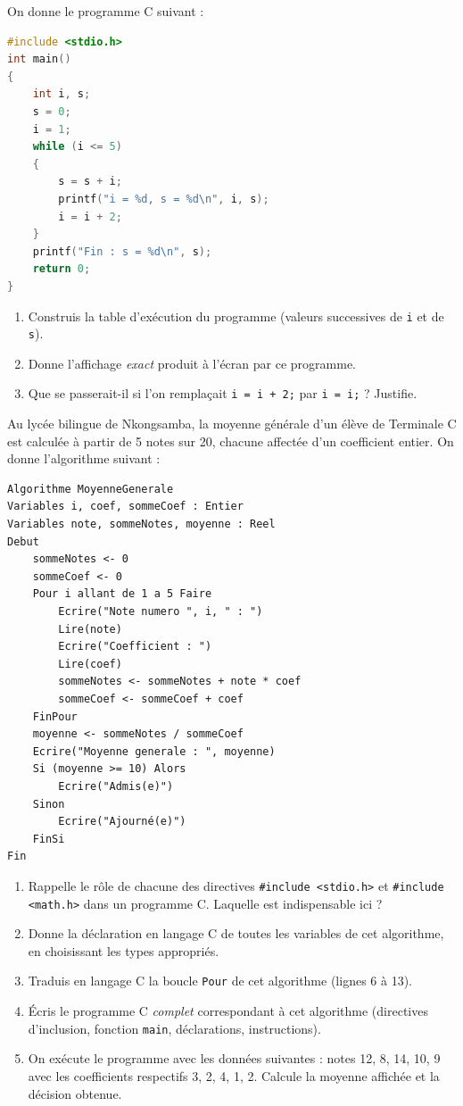 \documentclass[11pt]{article}
\newcounter{popsec}
\newcounter{popsub}
\newcommand{\courssub}[1]{%
  \stepcounter{popsub}%
  \par\vspace{9pt}\noindent{\popxbold\fontsize{11.5}{13}\selectfont\color{popink}{\color{poporange}\thepopsec.\thepopsub}\hspace{6pt}#1}\par\nopagebreak\vspace{4pt}
}
\begin{document}
\begin{exercice}
On donne le programme C suivant :
\begin{lstlisting}[language=C]
#include <stdio.h>
int main()
{
    int i, s;
    s = 0;
    i = 1;
    while (i <= 5)
    {
        s = s + i;
        printf("i = %d, s = %d\n", i, s);
        i = i + 2;
    }
    printf("Fin : s = %d\n", s);
    return 0;
}
\end{lstlisting}
\begin{enumerate}
  \item Construis la table d'exécution du programme (valeurs successives de \texttt{i} et de \texttt{s}).
  \item Donne l'affichage \emph{exact} produit à l'écran par ce programme.
  \item Que se passerait-il si l'on remplaçait \texttt{i = i + 2;} par \texttt{i = i;} ? Justifie.
\end{enumerate}
\end{exercice}

\courssub{Je me prépare au Bac}

\begin{exercice}
Au lycée bilingue de Nkongsamba, la moyenne générale d'un élève de Terminale C est calculée à partir de 5 notes sur 20, chacune affectée d'un coefficient entier. On donne l'algorithme suivant :

\begin{lstlisting}
Algorithme MoyenneGenerale
Variables i, coef, sommeCoef : Entier
Variables note, sommeNotes, moyenne : Reel
Debut
    sommeNotes <- 0
    sommeCoef <- 0
    Pour i allant de 1 a 5 Faire
        Ecrire("Note numero ", i, " : ")
        Lire(note)
        Ecrire("Coefficient : ")
        Lire(coef)
        sommeNotes <- sommeNotes + note * coef
        sommeCoef <- sommeCoef + coef
    FinPour
    moyenne <- sommeNotes / sommeCoef
    Ecrire("Moyenne generale : ", moyenne)
    Si (moyenne >= 10) Alors
        Ecrire("Admis(e)")
    Sinon
        Ecrire("Ajourné(e)")
    FinSi
Fin
\end{lstlisting}

\begin{enumerate}
  \item Rappelle le rôle de chacune des directives \texttt{\#include <stdio.h>} et \texttt{\#include <math.h>} dans un programme C. Laquelle est indispensable ici ?
  \item Donne la déclaration en langage C de toutes les variables de cet algorithme, en choisissant les types appropriés.
  \item Traduis en langage C la boucle \texttt{Pour} de cet algorithme (lignes 6 à 13).
  \item Écris le programme C \emph{complet} correspondant à cet algorithme (directives d'inclusion, fonction \texttt{main}, déclarations, instructions).
  \item On exécute le programme avec les données suivantes : notes 12, 8, 14, 10, 9 avec les coefficients respectifs 3, 2, 4, 1, 2. Calcule la moyenne affichée et la décision obtenue.
\end{enumerate}
\end{exercice}
\end{document}
